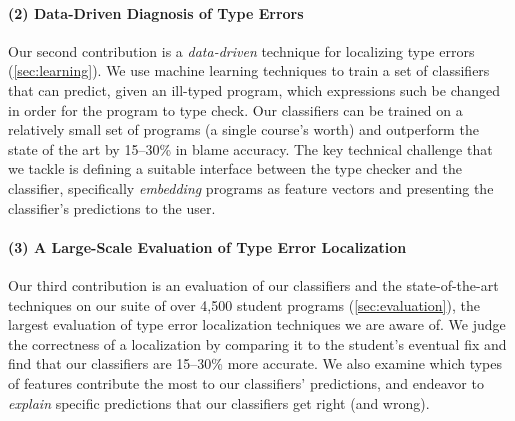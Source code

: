 \paragraph{\textbf{(2) Data-Driven Diagnosis of Type Errors}}
Our second contribution is a \emph{data-driven} technique for localizing
type errors (\autoref{sec:learning}).
%
We use machine learning techniques to train a set of classifiers that can
predict, given an ill-typed program, which expressions such be changed
in order for the program to type check.
%
Our classifiers can be trained on a relatively small set of programs
(\ie a single course's worth) and outperform the state of the art by
15--30\% in blame accuracy.
%
The key technical challenge that we tackle is defining a suitable
interface between the type checker and the classifier, specifically
\emph{embedding} programs as feature vectors and presenting the
classifier's predictions to the user.

\paragraph{\textbf{(3) A Large-Scale Evaluation of Type Error Localization}}
Our third contribution is an evaluation of our classifiers and the
state-of-the-art techniques on our suite of over 4,500 student programs
(\autoref{sec:evaluation}), the largest evaluation of type error
localization techniques we are aware of.
%
We judge the correctness of a localization by comparing it to the
student's eventual fix and find that our classifiers are 15--30\% more
accurate.
%
We also examine which types of features contribute the most to our
classifiers' predictions, and endeavor to \emph{explain} specific
predictions that our classifiers get right (and wrong).

